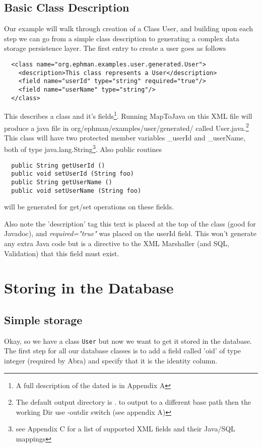 \documentclass[10pt,openany]{book}
\begin{document}
\subsection{Basic Class Description}
Our example will walk through creation of a Class User, and building
upon each step we can go from a simple class description to generating
a complex data storage persistence layer.  The first entry to create a user goes as follows
\begin{verbatim}
  <class name="org.ephman.examples.user.generated.User">
    <description>This class represents a User</description>
    <field name="userId" type="string" required="true"/>
    <field name="userName" type="string"/>
  </class>
\end{verbatim}
This describes a class and it's fields\footnote{A full description of
the dated is in Appendix A}.  Running MapToJava on this XML
file will produce a java file in
org/ephman/examples/user/generated/ called
User.java.\footnote{The default output directory is . to output to a
different base path then the working Dir use -outdir switch (see
appendix A)}  This
class will have two protected member variables \_userId and
\_userName, both of type java.lang.String\footnote{see Appendix C for
a list of supported XML fields and their Java/SQL mappings}. Also public routines
\begin{verbatim}
  public String getUserId ()
  public void setUserId (String foo)
  public String getUserName ()
  public void setUserName (String foo)
\end{verbatim}
will be generated for get/set operations on these fields.

Also note the 'description' tag this text is placed at the top of the
class (good for Javadoc), and \emph{required="true"} was placed on the
userId field.  This won't generate any extra Java code but is a
directive to the XML Marshaller (and SQL, Validation) that this field must exist.

\section{Storing in the Database}
\subsection{Simple storage}
Okay, so we have a class \texttt{User} but now we want to get it stored in the
database.  The first step for all our database classes is to add a
field called 'oid' of type integer (required by Abra) and specify that
it is the identity column.
\end{document}
